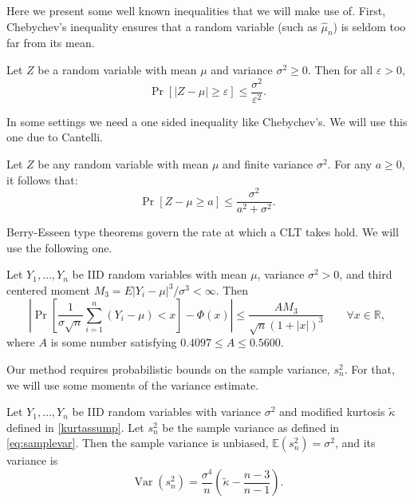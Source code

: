 \documentclass[graybox]{svmult}
\newcommand\reals{\mathbb{R}}
\newcommand\e{\mathbb{E}}
\newcommand{\Prob}{\Pr}
\newcommand{\abs}[1]{\left|#1\right|}
\DeclareMathOperator{\var}{Var}
\def\abs#1{\ensuremath{\left \lvert #1 \right \rvert}}
\begin{document}
Here we present some well known inequalities
that we will make use of.
First, Chebychev's inequality ensures that
a random variable (such as $\hat\mu_n$) is
seldom too far from its mean.

\begin{theorem} \citep[6.1c, p.\ 52]{LinBai10a}\label{Chebineqthm} Let $Z$ be a random variable with mean $\mu$ and variance $\sigma^2 \ge 0$.  
Then for all $\varepsilon >0$,
\[
\Prob[\abs{Z-\mu} \ge \varepsilon ] \le \frac{\sigma^2}{\varepsilon^2}.
\]
\end{theorem}


In some settings we need a one sided inequality
like Chebychev's. We will use this one due to Cantelli.

\begin{theorem} \citep[6.1e, p.\ 53]{LinBai10a} \label{Can}
Let $Z$ be any random variable with mean $\mu$ and finite variance $\sigma^2$.  For any $a\geq 0$, it
follows that:
\[
\Prob[Z-\mu \geq a]\leq \frac{\sigma^2}{a^2+\sigma^2}.
\]
\end{theorem}

Berry-Esseen type theorems govern the rate at which
a CLT takes hold. We will use the following one.

\begin{theorem} \cite[Theorem 5.16, p. 168]{Pet95a} \label{BE} Let $Y_1,\dots,Y_n$ be IID random variables with mean
$\mu$, variance $\sigma^2>0$, and third centered moment $M_3=E\abs{Y_i - \mu}^3/\sigma^3 < \infty$.
Then
\[
\abs{\Prob\left[\frac{1}{\sigma\sqrt{n}}\sum_{i=1}^{n}(Y_i-\mu)<x
\right]-\Phi(x)}\leq \frac{A M_3}{\sqrt{n}(1+\abs{x})^{3}} \qquad \forall x \in \reals,
\] 
where $A$ is some number satisfying $0.4097\leq A\leq 0.5600$.
\end{theorem}

Our method requires probabilistic bounds on the sample variance, $s_n^2$. For that,
we will use some moments of the variance estimate.

\begin{theorem} \cite[Eq.\ (7.16), p.\ 265]{Mil86} \label{Varvarthm} Let $Y_1, \ldots, Y_n$ be IID random variables with variance $\sigma^2$ and modified
kurtosis $\tilde \kappa$ defined in \eqref{kurtassump}.
Let  $s^2_n$ be the sample variance as defined in \eqref{eq:samplevar}.  Then the sample variance is unbiased, $\e(s^2_n)=\sigma^2$, and its variance is
\[
\var(s^2_n) = \frac{\sigma^4}{n} \left ( \tilde\kappa  - \frac{n-3}{n-1} \right).
\]
\end{theorem}
\end{document}
